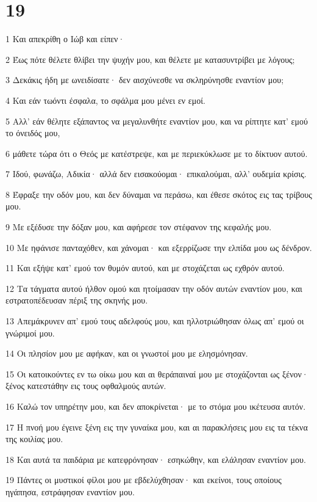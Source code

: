 \chapter{19}

\par 1 Και απεκρίθη ο Ιώβ και είπεν·
\par 2 Έως πότε θέλετε θλίβει την ψυχήν μου, και θέλετε με κατασυντρίβει με λόγους;
\par 3 Δεκάκις ήδη με ωνειδίσατε· δεν αισχύνεσθε να σκληρύνησθε εναντίον μου;
\par 4 Και εάν τωόντι έσφαλα, το σφάλμα μου μένει εν εμοί.
\par 5 Αλλ' εάν θέλητε εξάπαντος να μεγαλυνθήτε εναντίον μου, και να ρίπτητε κατ' εμού το όνειδός μου,
\par 6 μάθετε τώρα ότι ο Θεός με κατέστρεψε, και με περιεκύκλωσε με το δίκτυον αυτού.
\par 7 Ιδού, φωνάζω, Αδικία· αλλά δεν εισακούομαι· επικαλούμαι, αλλ' ουδεμία κρίσις.
\par 8 Έφραξε την οδόν μου, και δεν δύναμαι να περάσω, και έθεσε σκότος εις τας τρίβους μου.
\par 9 Με εξέδυσε την δόξαν μου, και αφήρεσε τον στέφανον της κεφαλής μου.
\par 10 Με ηφάνισε πανταχόθεν, και χάνομαι· και εξερρίζωσε την ελπίδα μου ως δένδρον.
\par 11 Και εξήψε κατ' εμού τον θυμόν αυτού, και με στοχάζεται ως εχθρόν αυτού.
\par 12 Τα τάγματα αυτού ήλθον ομού και ητοίμασαν την οδόν αυτών εναντίον μου, και εστρατοπέδευσαν πέριξ της σκηνής μου.
\par 13 Απεμάκρυνεν απ' εμού τους αδελφούς μου, και ηλλοτριώθησαν όλως απ' εμού οι γνώριμοί μου.
\par 14 Οι πλησίον μου με αφήκαν, και οι γνωστοί μου με ελησμόνησαν.
\par 15 Οι κατοικούντες εν τω οίκω μου και αι θεράπαιναί μου με στοχάζονται ως ξένον· ξένος κατεστάθην εις τους οφθαλμούς αυτών.
\par 16 Καλώ τον υπηρέτην μου, και δεν αποκρίνεται· με το στόμα μου ικέτευσα αυτόν.
\par 17 Η πνοή μου έγεινε ξένη εις την γυναίκα μου, και αι παρακλήσεις μου εις τα τέκνα της κοιλίας μου.
\par 18 Και αυτά τα παιδάρια με κατεφρόνησαν· εσηκώθην, και ελάλησαν εναντίον μου.
\par 19 Πάντες οι μυστικοί φίλοι μου με εβδελύχθησαν· και εκείνοι, τους οποίους ηγάπησα, εστράφησαν εναντίον μου.
